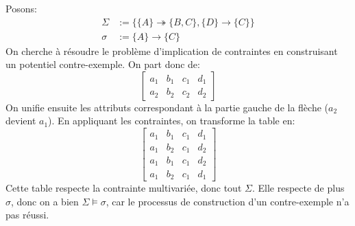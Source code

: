 \documentclass[french, toc]{../cs-classes/cs-classes}
\begin{document}
\begin{exemple}
    Posons:
    \begin{equation*}
        \begin{aligned}
            \Sigma &:= \{\{A\}\twoheadrightarrow\{B, C\}, \{D\}\rightarrow\{C\}\}\\
            \sigma &:= \{A\} \rightarrow \{C\}
        \end{aligned}
    \end{equation*}
    On cherche à résoudre le problème d'implication de contraintes en construisant un potentiel contre-exemple. On part donc de:
    \begin{equation*}
        \begin{bmatrix}
            a_1&b_1&c_1&d_1\\
            a_2&b_2&c_2&d_2
        \end{bmatrix}
    \end{equation*}
    On unifie ensuite les attributs correspondant à la partie gauche de la flèche ($a_2$ devient $a_1$). En appliquant les contraintes, on transforme la table en:
    \begin{equation*}
        \begin{bmatrix}
            a_1&b_1&c_1&d_1\\
            a_1&b_2&c_1&d_2\\
            a_1&b_1&c_1&d_2\\
            a_1&b_2&c_1&d_1
        \end{bmatrix}
    \end{equation*}
    Cette table respecte la contrainte multivariée, donc tout $\Sigma$. Elle respecte de plus $\sigma$, donc on a bien $\Sigma\vDash\sigma$, car le processus de construction d'un contre-exemple n'a pas réussi.
\end{exemple}
\end{document}
